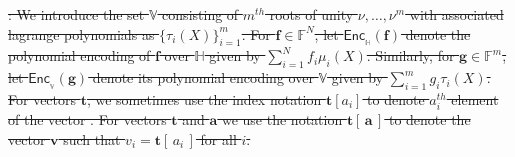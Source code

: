\documentclass[sigconf]{acmart}
\renewcommand{\vec}{\mathbf} %
\newcommand{\enc}[2]{\mathsf{Enc}_{{}_{#2}}(\vec{#1})}
\newcommand{\setV}{\mathbb{V}}
\newcommand{\setN}{\mathbb{H}}
\newcommand{\F}{\mathbb{F}}
\newcommand{\chaya}[1]{\textcolor{cyan}{Chaya: #1}}
\providecommand{\DIFdeltex}[1]{{\protect\color{red}\sout{#1}}}                      %
\providecommand{\DIFdel}[1]{\texorpdfstring{\DIFdeltex{#1}}{}} %
\begin{document}
	\DIFdel{:
		We introduce the set $\setV$ consisting of $m^{th}$ roots of unity
		$\nu,\ldots,\nu^m$ with associated lagrange polynomials as $\{\tau_i(X)\}_{i=1}^m$. For $\vec{f}\in \F^N$, let $\enc{f}{\setN}$ denote the polynomial encoding of $\vec{f}$ over $\setN$ given by $\sum_{i=1}^N f_i\mu_i(X)$. Similarly,
		for $\vec{g}\in \F^m$, let $\enc{g}{\setV}$ denote its polynomial encoding over $\setV$ given by $\sum_{i=1}^m g_i\tau_i(X)$. For vectors $\vec{t}$, we sometimes use the index notation $\vec{t}[a_i]$ to denote $a_i^{th}$ element of the vector . For vectors
		$\vec{t}$ and $\vec{a}$ we use the notation $\vec{t}[\,\vec{a}\,]$ to denote the vector $\vec{v}$ such that $v_i=\vec{t}[\,a_i\,]$ for all $i$.
	}%
	
\end{document}
